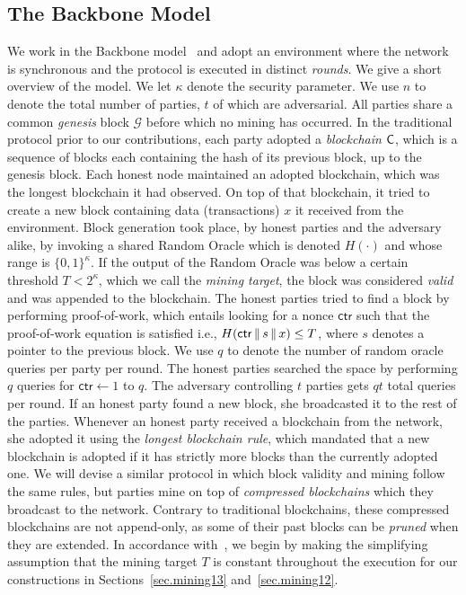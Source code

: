 \subsection{The Backbone Model}
We work in the Backbone model~\cite{EC:GarKiaLeo15} and adopt an
environment where the network is synchronous and the protocol is executed in
distinct \emph{rounds}. We give a short overview of the model. We let $\kappa$
denote the security parameter. We use $n$ to denote the total number of parties,
$t$ of which are adversarial. All parties share a common \emph{genesis} block
$\mathcal{G}$ before which no mining has occurred. In the traditional protocol
prior to our contributions, each party adopted a
\emph{blockchain} $\mathsf{C}$, which is a sequence of blocks each containing the
hash of its previous block, up to the genesis block. Each honest node maintained
an adopted blockchain, which was the longest blockchain it had observed. On top
of that blockchain, it tried to create a new block containing data
(transactions) $x$ it received from the environment. Block generation took
place, by honest parties and the adversary alike, by invoking a shared Random
Oracle which is denoted $H(\cdot)$ and whose range is $\{0,1\}^\kappa$. If the
output of the Random Oracle was below a certain threshold $T < 2^\kappa$, which
we call the \emph{mining target}, the block was considered \emph{valid} and was
appended to the blockchain. The honest parties tried to find a block by performing
proof-of-work, which entails looking for a nonce $\mathsf{ctr}$ such that the
proof-of-work equation is satisfied i.e., $H(\mathsf{ctr} \,\|\, s \,\|\, x) \leq T$,
where $s$ denotes a pointer to the previous block. We use $q$ to denote the
number of random oracle queries per party per round. The honest parties searched
the space by performing $q$ queries for $\mathsf{ctr} \gets 1$ to $q$. The
adversary controlling $t$ parties gets $qt$ total queries per round. If an
honest party found a new block, she broadcasted it to the rest of the parties.
Whenever an honest party received a blockchain from the network, she adopted it
using the \emph{longest blockchain rule}, which mandated that a new blockchain
is adopted if it has strictly more blocks than the currently adopted one.
We will devise a similar protocol in which block validity and mining follow the
same rules, but parties mine on top of \emph{compressed blockchains} which they
broadcast to the network. Contrary to traditional blockchains, these compressed
blockchains are not append-only, as some of their past blocks can be
\emph{pruned} when they are extended.
In accordance with~\cite{EC:GarKiaLeo15},
we begin by making the simplifying assumption that the mining target $T$ is
constant throughout the execution for our constructions in
Sections~\ref{sec.mining13} and~\ref{sec.mining12}.

